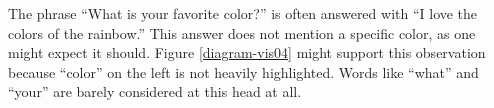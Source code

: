 The phrase ``What is your favorite color?'' is often answered with ``I love the colors of the rainbow.'' This answer does not mention a specific color, as one might expect it should. Figure \ref{diagram-vis04} might support this observation because ``color'' on the left is not heavily highlighted. Words like ``what'' and ``your'' are barely considered at this head at all. 

